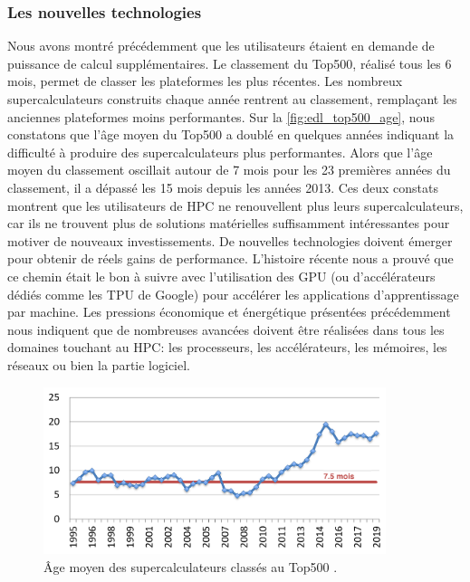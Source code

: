     \subsubsection{Les nouvelles technologies}\label{sec:edl_chal_new_techno}

        Nous avons montré précédemment que les utilisateurs étaient en demande de puissance de calcul supplémentaires. 
        Le classement du Top500,  réalisé tous les 6 mois, permet de classer les plateformes les plus récentes. Les nombreux supercalculateurs construits chaque année rentrent au classement, remplaçant les anciennes plateformes moins performantes. Sur la \autoref{fig:edl_top500_age}, nous constatons que l'âge moyen du Top500 a doublé en quelques années indiquant la difficulté à produire des supercalculateurs plus performantes. Alors que l'âge moyen du classement oscillait autour de 7 mois pour les 23 premières années du classement, il a dépassé les 15 mois depuis les années 2013. Ces deux constats montrent que les utilisateurs de HPC ne renouvellent plus leurs supercalculateurs, car ils ne trouvent plus de solutions matérielles suffisamment intéressantes pour motiver de nouveaux investissements. De nouvelles technologies doivent émerger pour obtenir de réels gains de performance. L'histoire récente nous a prouvé que ce chemin était le bon à suivre avec l'utilisation des GPU (ou d'accélérateurs dédiés comme les TPU de Google) pour accélérer les applications d'apprentissage par machine. Les pressions économique et énergétique présentées précédemment nous indiquent que de nombreuses avancées doivent être réalisées dans tous les domaines touchant au HPC: les processeurs, les accélérateurs, les mémoires, les réseaux ou bien la partie logiciel. 
        
        
                  
            \begin{figure}
                \center
                \includegraphics[width=10cm]{images/edl_top500_age.png}
                \caption{\label{fig:edl_top500_age} Âge moyen des supercalculateurs classés au Top500 \cite{Strohmaier2018}.}
            \end{figure}
       
